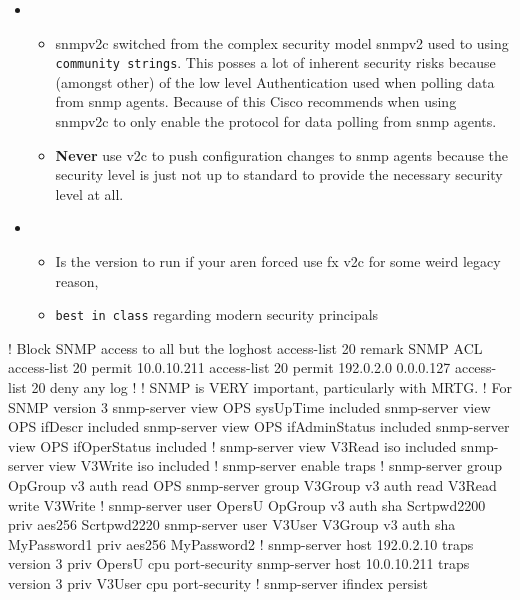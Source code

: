 \begin{itemize}
	\item {}
	\begin{itemize}
		\item \gls{snmp}v2c switched from the complex security model \gls{snmp}v2 used to using \texttt{community strings}. This posses a lot of inherent security risks because (amongst other) of the low level Authentication used when polling data from \gls{snmp} agents. Because of this Cisco recommends when using \gls{snmp}v2c to only enable the protocol for data polling from \gls{snmp} agents.
		\item \textbf{Never} use v2c to push configuration changes to \gls{snmp} agents because the security level is just not up to standard to provide the necessary security level at all.
	\end{itemize}
	\item {}
	\begin{itemize}
		\item Is the  version to run if your aren forced use fx v2c for some weird legacy reason,
		\item \texttt{best in class} regarding modern security principals
	\end{itemize}
\end{itemize}



\begin{cisco}
! Block SNMP access to all but the loghost
access-list 20 remark SNMP ACL
access-list 20 permit 10.0.10.211
access-list 20 permit 192.0.2.0 0.0.0.127
access-list 20 deny any log
!
! SNMP is VERY important, particularly with MRTG.
! For SNMP version 3
snmp-server view OPS sysUpTime included
snmp-server view OPS ifDescr included
snmp-server view OPS ifAdminStatus included
snmp-server view OPS ifOperStatus included
!
snmp-server view V3Read iso included
snmp-server view V3Write iso included
!
snmp-server enable traps
!
snmp-server group OpGroup v3 auth read OPS
snmp-server group V3Group v3 auth read V3Read write V3Write
!
snmp-server user OpersU OpGroup v3 auth sha Scrtpwd2200 priv aes256 Scrtpwd2220
snmp-server user V3User V3Group v3 auth sha MyPassword1 priv aes256 MyPassword2
!
snmp-server host 192.0.2.10 traps version 3 priv OpersU cpu port-security
snmp-server host 10.0.10.211 traps version 3 priv V3User cpu port-security
!
snmp-server ifindex persist
\end{cisco}

